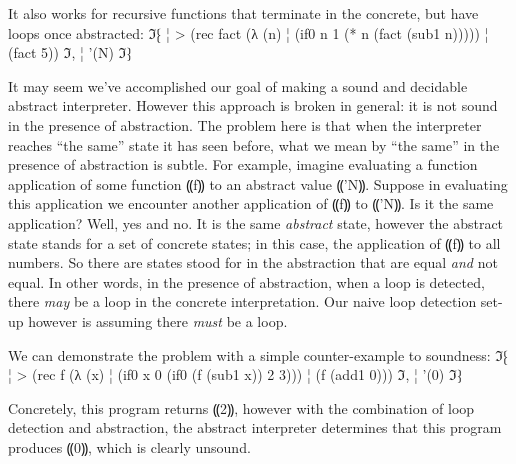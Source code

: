 It also works for recursive functions that terminate in the concrete,
but have loops once abstracted:
ℑ⁅
¦ > (rec fact (λ (n)
¦              (if0 n 1 (* n (fact (sub1 n)))))
¦     (fact 5))
ℑ,
¦ '(N)
ℑ⁆

It may seem we've accomplished our goal of making a sound and
decidable abstract interpreter.  However this approach is broken in
general: it is not sound in the presence of abstraction.  The problem
here is that when the interpreter reaches ``the same'' state it has
seen before, what we mean by ``the same'' in the presence of
abstraction is subtle.  For example, imagine evaluating a function
application of some function ⸨f⸩ to an abstract value
⸨'N⸩.  Suppose in evaluating this application we encounter
another application of ⸨f⸩ to ⸨'N⸩.  Is it the same
application?  Well, yes and no.  It is the same \emph{abstract} state,
however the abstract state stands for a set of concrete states; in
this case, the application of ⸨f⸩ to all numbers.  So there are
states stood for in the abstraction that are equal \emph{and} not
equal.  In other words, in the presence of abstraction, when a loop is
detected, there \emph{may} be a loop in the concrete interpretation.
Our naive loop detection set-up however is assuming there \emph{must}
be a loop.

We can demonstrate the problem with a simple counter-example to
soundness:
ℑ⁅
¦ > (rec f (λ (x) 
¦            (if0 x 0 (if0 (f (sub1 x)) 2 3)))
¦      (f (add1 0)))
ℑ,
¦ '(0)
ℑ⁆

Concretely, this program returns ⸨2⸩, however with the
combination of loop detection and abstraction, the abstract
interpreter determines that this program produces ⸨0⸩, which is
clearly unsound.
